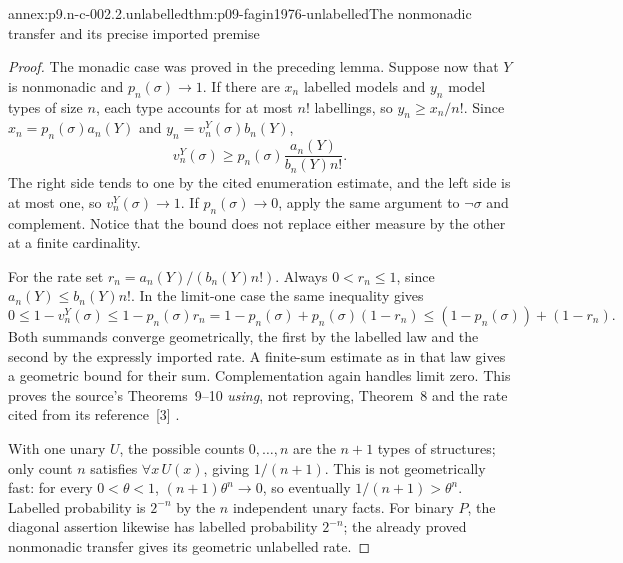 \begin{annexitem}{annex:p9.n-c-002.2.unlabelled}{thm:p09-fagin1976-unlabelled}{The nonmonadic transfer and its precise imported premise}
\begin{proof}
The monadic case was proved in the preceding lemma.  Suppose now that
\(Y\) is nonmonadic and \(p_n(\sigma)\to1\).
If there are \(x_n\) labelled models and \(y_n\) model types of
size \(n\), each type accounts for at most \(n!\) labellings,
so \(y_n\geq x_n/n!\).  Since
\(x_n=p_n(\sigma)a_n(Y)\) and
\(y_n=v_n^Y(\sigma)b_n(Y)\),
\[
 v_n^Y(\sigma)\geq
 p_n(\sigma)\frac{a_n(Y)}{b_n(Y)n!}.
\]
The right side tends to one by the cited enumeration estimate, and
the left side is at most one, so \(v_n^Y(\sigma)\to1\).
If \(p_n(\sigma)\to0\), apply the same argument to
\(\neg\sigma\) and complement.  Notice that the bound does
not replace either measure by the other at a finite cardinality.

For the rate set \(r_n=a_n(Y)/(b_n(Y)n!)\).
Always \(0<r_n\leq1\), since \(a_n(Y)\leq b_n(Y)n!\).
In the limit-one case the same inequality gives
\[
 0\leq1-v_n^Y(\sigma)
 \leq 1-p_n(\sigma)r_n
 =1-p_n(\sigma)+p_n(\sigma)(1-r_n)
 \leq (1-p_n(\sigma))+(1-r_n).
\]
Both summands converge geometrically, the first by the labelled law
and the second by the expressly imported rate.  A finite-sum estimate
as in that law gives a geometric bound for their sum.  Complementation
again handles limit zero.  This proves the source's Theorems~9--10
\emph{using}, not reproving, Theorem~8 and the rate cited from its
reference~[3] \cite[pp.~54--56]{Fagin1976}.

With one unary \(U\), the possible counts \(0,\ldots,n\) are
the \(n+1\) types of structures; only count \(n\) satisfies
\(\forall x\,U(x)\), giving \(1/(n+1)\).  This is not
geometrically fast: for every \(0<\theta<1\),
\((n+1)\theta^n\to0\), so eventually \(1/(n+1)>\theta^n\).
Labelled probability is \(2^{-n}\) by the \(n\) independent
unary facts.  For binary \(P\), the diagonal assertion likewise
has labelled probability \(2^{-n}\); the already proved
nonmonadic transfer gives its geometric unlabelled rate.
\end{proof}
\end{annexitem}


